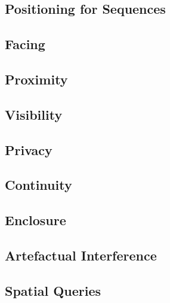 \documentclass[12pt]{article}
\begin{document}
\subsection{Positioning for Sequences}

\subsection{Facing}

\subsection{Proximity}

\subsection{Visibility}

\subsection{Privacy}

\subsection{Continuity}

\subsection{Enclosure}

\subsection{Artefactual Interference}

\subsection{Spatial Queries}


\end{document}

